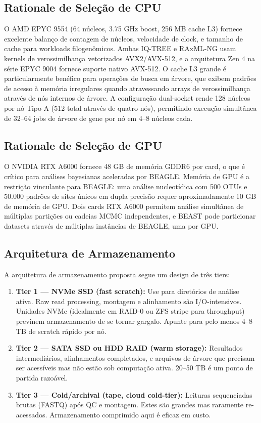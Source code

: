 \subsection{Rationale de Seleção de CPU}

O AMD EPYC 9554 (64 núcleos, 3.75 GHz boost, 256 MB cache L3) fornece excelente balanço de contagem de núcleos, velocidade de clock, e tamanho de cache para workloads filogenômicos. Ambas IQ-TREE e RAxML-NG usam kernels de verossimilhança vetorizados AVX2/AVX-512, e a arquitetura Zen 4 na série EPYC 9004 fornece suporte nativo AVX-512. O cache L3 grande é particularmente benéfico para operações de busca em árvore, que exibem padrões de acesso à memória irregulares quando atravessando arrays de verossimilhança através de nós internos de árvore. A configuração dual-socket rende 128 núcleos por nó Tipo A (512 total através de quatro nós), permitindo execução simultânea de 32--64 jobs de árvore de gene por nó em 4--8 núcleos cada.

\subsection{Rationale de Seleção de GPU}

O NVIDIA RTX A6000 fornece 48 GB de memória GDDR6 por card, o que é crítico para análises bayesianas aceleradas por BEAGLE. Memória de GPU é a restrição vinculante para BEAGLE: uma análise nucleotídica com 500 OTUs e 50.000 padrões de sites únicos em dupla precisão requer aproximadamente 10 GB de memória de GPU. Dois cards RTX A6000 permitem análise simultânea de múltiplas partições ou cadeias MCMC independentes, e BEAST pode particionar datasets através de múltiplas instâncias de BEAGLE, uma por GPU.

\subsection{Arquitetura de Armazenamento}

A arquitetura de armazenamento proposta segue um design de três tiers:

\begin{enumerate}
\item \textbf{Tier 1 --- NVMe SSD (fast scratch):} Use para diretórios de análise ativa. Raw read processing, montagem e alinhamento são I/O-intensivos. Unidades NVMe (idealmente em RAID-0 ou ZFS stripe para throughput) previnem armazenamento de se tornar gargalo. Apunte para pelo menos 4--8 TB de scratch rápido por nó.

\item \textbf{Tier 2 --- SATA SSD ou HDD RAID (warm storage):} Resultados intermediários, alinhamentos completados, e arquivos de árvore que precisam ser acessíveis mas não estão sob computação ativa. 20--50 TB é um ponto de partida razoável.

\item \textbf{Tier 3 --- Cold/archival (tape, cloud cold-tier):} Leituras sequenciadas brutas (FASTQ) após QC e montagem. Estes são grandes mas raramente re-acessados. Armazenamento comprimido aqui é eficaz em custo.
\end{enumerate}

